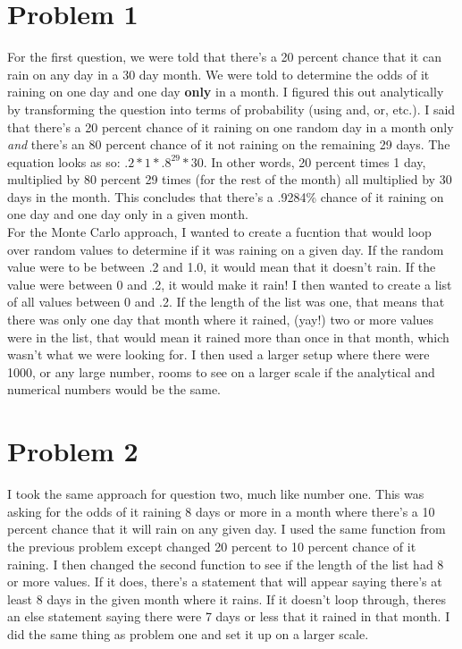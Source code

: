 \documentclass[twocolumn]{revtex4}
\begin{document}
\section{Problem 1}
For the first question, we were told that there's a 20 percent chance that it can rain on any day in a 30 day month. We were told to determine the odds of it raining on one day and one day {\bf only} in a month. I figured this out analytically by transforming the question into terms of probability (using and, or, etc.). I said that there's a 20 percent chance of it raining on one random day in a month only {\it and} there's an 80 percent chance of it not raining on the remaining 29 days. The equation looks as so: $ .2 * 1 * .8^{29} * 30 $. In other words, 20 percent times 1 day, multiplied by 80 percent 29 times (for the rest of the month) all multiplied by 30 days in the month.  This concludes that there's a .9284\% chance of it raining on one day and one day only in a given month.
\\For the Monte Carlo approach, I wanted to create a fucntion that would loop over random values to determine if it was raining on a given day. If the random value were to be between .2 and 1.0, it would mean that it doesn't rain. If the value were between 0 and .2, it would make it rain! I then wanted to create a list of all values between 0 and .2. If the length of the list was one, that means that there was only one day that month where it rained, (yay!) two or more values were in the list, that would mean it rained more than once in that month, which wasn't what we were looking for. I then used a larger setup where there were 1000, or any large number, rooms to see on a larger scale if the analytical and numerical numbers would be the same.



\section{Problem 2}

I took the same approach for question two, much like number one. This was asking for the odds of it raining 8 days or more in a month where there's a 10 percent chance that it will rain on any given day. I used the same function from the previous problem except changed 20 percent to 10 percent chance of it raining. I then changed the second function to see if the length of the list had 8 or more values. If it does, there's a statement that will appear saying there's at least 8 days in the given month where it rains. If it doesn't loop through, theres an else statement saying there were 7 days or less that it rained in that month. I did the same thing as problem one and set it up on a larger scale.
\end{document}
